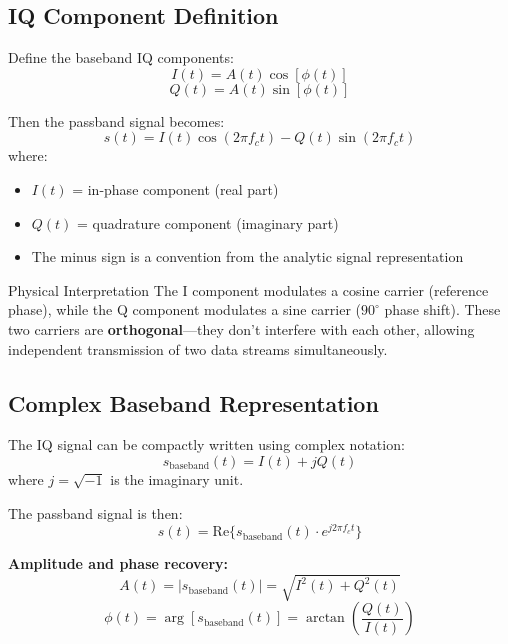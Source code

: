 \subsection{IQ Component Definition}

Define the baseband IQ components:
\begin{equation}
I(t) = A(t)\cos[\phi(t)]
\end{equation}
\begin{equation}
Q(t) = A(t)\sin[\phi(t)]
\end{equation}

Then the passband signal becomes:
\begin{equation}
s(t) = I(t) \cos(2\pi f_c t) - Q(t) \sin(2\pi f_c t)
\end{equation}
where:
\begin{itemize}
\item $I(t)$ = in-phase component (real part)
\item $Q(t)$ = quadrature component (imaginary part)
\item The minus sign is a convention from the analytic signal representation
\end{itemize}

\begin{calloutbox}{Physical Interpretation}
The I component modulates a cosine carrier (reference phase), while the Q component modulates a sine carrier ($90^\circ$ phase shift). These two carriers are \textbf{orthogonal}---they don't interfere with each other, allowing independent transmission of two data streams simultaneously.
\end{calloutbox}

\subsection{Complex Baseband Representation}

The IQ signal can be compactly written using complex notation:
\begin{equation}
s_{\mathrm{baseband}}(t) = I(t) + jQ(t)
\end{equation}
where $j = \sqrt{-1}$ is the imaginary unit.

The passband signal is then:
\begin{equation}
s(t) = \mathrm{Re}\{s_{\mathrm{baseband}}(t) \cdot e^{j2\pi f_c t}\}
\end{equation}

\textbf{Amplitude and phase recovery:}
\begin{equation}
A(t) = |s_{\mathrm{baseband}}(t)| = \sqrt{I^2(t) + Q^2(t)}
\end{equation}
\begin{equation}
\phi(t) = \arg[s_{\mathrm{baseband}}(t)] = \arctan\left(\frac{Q(t)}{I(t)}\right)
\end{equation}

